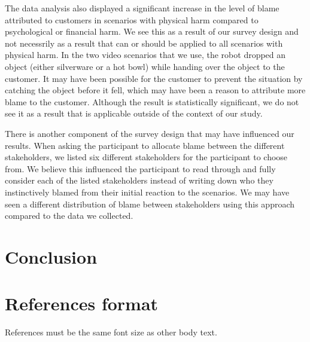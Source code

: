 \documentclass{sigchi}
\begin{document}
The data analysis also displayed a significant increase in the level of blame attributed to customers in scenarios with physical harm compared to psychological or financial harm. We see this as a result of our survey design and not necessrily as a result that can or should be applied to all scenarios with physical harm. In the two video scenarios that we use, the robot dropped an object (either silverware or a hot bowl) while handing over the object to the customer. It may have been possible for the customer to prevent the situation by catching the object before it fell, which may have been a reason to attribute more blame to the customer. Although the result is statistically significant, we do not see it as a result that is applicable outside of the context of our study.

There is another component of the survey design that may have influenced our results. When asking the participant to allocate blame between the different stakeholders, we listed six different stakeholders for the participant to choose from. We believe this influenced the participant to read through and fully consider each of the listed stakeholders instead of writing down who they instinctively blamed from their initial reaction to the scenarios. We may have seen a different distribution of blame between stakeholders using this approach compared to the data we collected.

\section{Conclusion}

%
%


\section{References format}
References must be the same font size as other body text.


\end{document}
